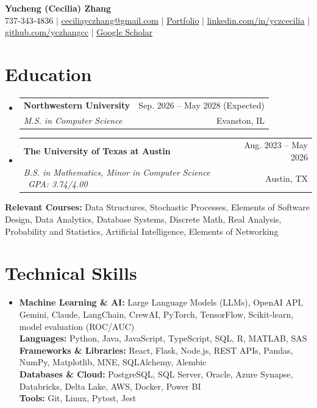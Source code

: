 \documentclass[letterpaper,10pt]{article}
\makeatletter
\newcommand{\resumeSubheading}[4]{
  \vspace{-2pt}\item
    \begin{tabular*}{0.985\textwidth}[t]{l@{\extracolsep{\fill}}r}
      \textbf{#1} & \small #2 \\
      \textit{\small #3} & \small #4 \\
    \end{tabular*}\vspace{-4pt}
}
\newcommand{\resumeSubHeadingListStart}{\begin{itemize}[leftmargin=0.11in,label={}]}
\newcommand{\resumeSubHeadingListEnd}{\end{itemize}\vspace{-2pt}}
\makeatother
\begin{document}
\begin{center}
{\Large\textbf{Yucheng (Cecilia) Zhang}}\\[-1pt]
\small 737-343-4836 $|$ \href{mailto:ceciliayczhang@gmail.com}{ceciliayczhang@gmail.com} $|$
\href{https://yczhangcc.github.io/yuchengzhang_portfolio/}{Portfolio} $|$
\href{https://www.linkedin.com/in/yczcecilia/}{linkedin.com/in/yczcecilia} $|$
\href{https://github.com/yczhangcc}{github.com/yczhangcc} $|$
\href{https://scholar.google.com/citations?user=Stx_NRQAAAAJ&hl=en}{Google Scholar}
\end{center}
\vspace{-8pt}

\section{Education}
\resumeSubHeadingListStart
\resumeSubheading{Northwestern University}{Sep. 2026 -- May 2028 (Expected)}{M.S. in Computer Science}{Evanston, IL}
\resumeSubheading{The University of Texas at Austin}{Aug. 2023 -- May 2026}{B.S. in Mathematics, Minor in Computer Science \textbar\ GPA: 3.74/4.00}{Austin, TX}
\resumeSubHeadingListEnd
\vspace{-3pt}
\small{\textbf{Relevant Courses:} Data Structures, Stochastic Processes, Elements of Software Design, Data Analytics, Database Systems, Discrete Math, Real Analysis, Probability and Statistics, Artificial Intelligence, Elements of Networking}
\vspace{-4pt}

\section{Technical Skills}
\begin{itemize}[leftmargin=0.11in,label={},topsep=1pt,itemsep=0pt]
\small\item{
\textbf{Machine Learning \& AI:} Large Language Models (LLMs), OpenAI API, Gemini, Claude, LangChain, CrewAI, PyTorch, TensorFlow, Scikit-learn, model evaluation (ROC/AUC) \\
\textbf{Languages:} Python, Java, JavaScript, TypeScript, SQL, R, MATLAB, SAS \\
\textbf{Frameworks \& Libraries:} React, Flask, Node.js, REST APIs, Pandas, NumPy, Matplotlib, MNE, SQLAlchemy, Alembic \\
\textbf{Databases \& Cloud:} PostgreSQL, SQL Server, Oracle, Azure Synapse, Databricks, Delta Lake, AWS, Docker, Power BI \\
\textbf{Tools:} Git, Linux, Pytest, Jest
}
\end{itemize}
\vspace{-7pt}
\end{document}
